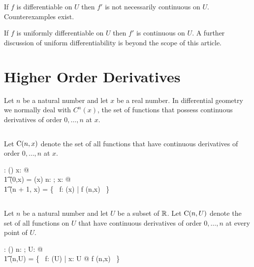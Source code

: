 \documentclass{amsart}
\begin{document}
\begin{remark}
If $f$ is differentiable on $U$ then $f'$ is not necessarily continuous on $U$.
Counterexamples exist.
\end{remark}

\begin{remark}
If $f$ is uniformly differentiable on $U$ then $f'$ is continuous on $U$.
A further discussion of uniform differentiability is beyond the scope of this article.
\end{remark}

\section{Higher Order Derivatives}

Let $n$ be a natural number and let $x$ be a real number.
In differential geometry we normally deal with $C^n(x)$, the set of functions
that possess continuous derivatives of order $0, \ldots, n$ at $x$.

\subsection{}

Let $\operatorname{C}(n,x)$ denote the set of all functions that have continuous derivatives of order $0, \ldots, n$ at $x$.

\begin{axdef}
	\CnR: \nat \cross \R \fun \power(\R \pfun \R)
\where
	\forall x: \R @ \\
	\t1	\CnR(0,x) = \CzeroR(x)
\also
	\forall n: \nat; x: \R @ \\
	\t1	\CnR(n + 1, x) = \{~ f: \diffR(x) | \derivF f \in \CnR(n,x) ~\}
\end{axdef}

\subsection{}

Let $n$ be a natural number and let $U$ be a subset of $\mathbb{R}$.
Let $\operatorname{C}(n,U)$ denote the set of all functions on $U$ that have continuous derivatives of order $0, \ldots, n$
at every point of $U$.

\begin{axdef}
	\CnPR: \nat \cross \power \R \fun \power(\R \pfun \R)
\where
	\forall n: \nat; U: \power \R @ \\
	\t1	\CnPR(n,U) = \{~ f: \FunPR(U) | \forall x: U @ f \in \CnR(n,x) ~\}
\end{axdef}
\end{document}
